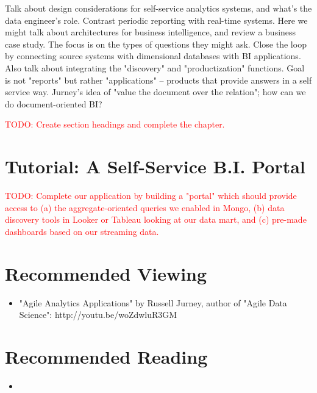 \documentclass[11pt]{book}
\newcommand{\todo}[1]{\textcolor{red}{TODO: #1}} %
\begin{document}
Talk about design considerations for self-service analytics systems, and what's the data engineer's role.  Contrast periodic reporting with real-time systems.  Here we might talk about architectures for business intelligence, and review a business case study.  The focus is on the types of questions they might ask.  Close the loop by connecting source systems with dimensional databases with BI applications.  Also talk about integrating the "discovery" and "productization" functions.  Goal is not "reports" but rather "applications" -- products that provide answers in a self service way.  Jurney's idea of "value the document over the relation"; how can we do document-oriented BI?

\todo{Create section headings and complete the chapter.}

\section{Tutorial: A Self-Service B.I. Portal}

\todo{Complete our application by building a "portal" which should provide access to (a) the aggregate-oriented queries we enabled in Mongo, (b) data discovery tools in Looker or Tableau looking at our data mart, and (c) pre-made dashboards based on our streaming data.}

\section*{Recommended Viewing}
\begin{itemize}
    \item "Agile Analytics Applications" by Russell Jurney, author of "Agile Data Science": http://youtu.be/woZdwluR3GM
\end{itemize}

\section*{Recommended Reading}
\begin{itemize}
    \item 
\end{itemize}











\end{document}
